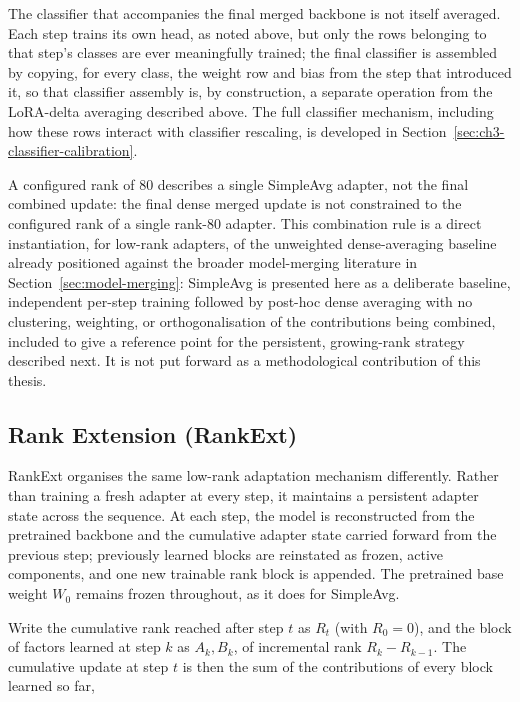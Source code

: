 The classifier that accompanies the final merged backbone is not itself
averaged. Each step trains its own head, as noted above, but only the rows
belonging to that step's classes are ever meaningfully trained; the final
classifier is assembled by copying, for every class, the weight row and
bias from the step that introduced it, so that classifier assembly is, by
construction, a separate operation from the LoRA-delta averaging described
above. The full classifier mechanism, including how these rows interact
with classifier rescaling, is developed in Section~\ref{sec:ch3-classifier-calibration}.

A configured rank of 80 describes a single SimpleAvg adapter, not the
final combined update: the final dense merged update is not constrained to
the configured rank of a single rank-80 adapter. This combination rule is a direct instantiation,
for low-rank
adapters, of the unweighted dense-averaging baseline already positioned
against the broader model-merging literature in Section~\ref{sec:model-merging}: SimpleAvg is
presented here as a deliberate baseline, independent per-step training
followed by post-hoc dense averaging with no clustering, weighting, or
orthogonalisation of the contributions being combined, included to give a
reference point for the persistent, growing-rank strategy described next.
It is not put forward as a methodological contribution of this thesis.

\subsection{Rank Extension (RankExt)}
\label{sec:ch3-rankext}

RankExt organises the same low-rank adaptation mechanism differently.
Rather than training a fresh adapter at every step, it maintains a
persistent adapter state across the sequence. At each step, the model is
reconstructed from the pretrained backbone and the cumulative adapter state
carried forward from the previous step; previously learned blocks are
reinstated as frozen, active components, and one new trainable rank block
is appended. The pretrained base weight $W_0$ remains frozen throughout, as
it does for SimpleAvg.

Write the cumulative rank reached after step $t$ as $R_t$ (with $R_0=0$),
and the block of factors learned at step $k$ as $A_k, B_k$, of incremental
rank $R_k - R_{k-1}$. The cumulative update at step $t$ is then the sum of
the contributions of every block learned so far,

